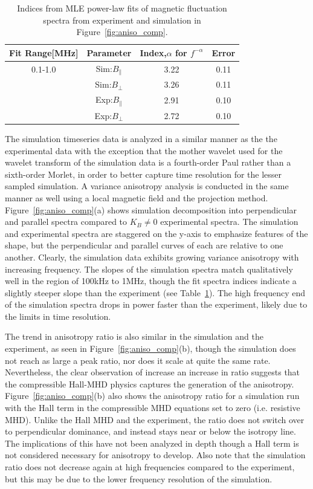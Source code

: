 \documentclass[aip,prl,amsmath,amssymb,reprint,superscriptaddress]{revtex4-1} %
\begin{document}
\begin{table}
\caption{\label{tab:Simindices}Indices from MLE power-law fits of magnetic fluctuation spectra from experiment and simulation in Figure~\ref{fig:aniso_comp}.}
\begin{tabular}{cccc}
\toprule
Fit Range[MHz]	&	Parameter						&	Index,$\alpha$ for $f^{-\alpha}$	&Error\\
\hline
0.1-1.0					& Sim:$B_{\parallel}$	& 3.22	&0.11\\
								& Sim:$B_{\perp}$			& 3.26  &0.11\\
								& Exp:$B_{\parallel}$	& 2.91	&0.10\\
								& Exp:$B_{\perp}$			& 2.72  &0.10\\
\hline
\end{tabular}
\end{table}

The simulation timeseries data is analyzed in a similar manner as the the experimental data with the exception that the mother wavelet used for the wavelet transform of the simulation data is a fourth-order Paul rather than a sixth-order Morlet, in order to better capture time resolution for the lesser sampled simulation. A variance anisotropy analysis is conducted in the same manner as well using a local magnetic field and the projection method. Figure~\ref{fig:aniso_comp}(a) shows simulation decomposition into perpendicular and parallel spectra compared to $K_{B}\neq 0$ experimental spectra. The simulation and experimental spectra are staggered on the y-axis to emphasize features of the shape, but the perpendicular and parallel curves of each are relative to one another. Clearly, the simulation data exhibits growing variance anisotropy with increasing frequency. The slopes of the simulation spectra match qualitatively well in the region of 100kHz to 1MHz, though the fit spectra indices indicate a slightly steeper slope than the experiment (see Table~\ref{tab:Simindices}). The high frequency end of the simulation spectra drops in power faster than the experiment, likely due to the limits in time resolution.

The trend in anisotropy ratio is also similar in the simulation and the experiment, as seen in Figure~\ref{fig:aniso_comp}(b), though the simulation does not reach as large a peak ratio, nor does it scale at quite the same rate. Nevertheless, the clear observation of increase an increase in ratio suggests that the compressible Hall-MHD physics captures the generation of the anisotropy. Figure~\ref{fig:aniso_comp}(b) also shows the anisotropy ratio for a simulation run with the Hall term in the compressible MHD equations set to zero (i.e. resistive MHD). Unlike the Hall MHD and the experiment, the ratio does not switch over to perpendicular dominance, and instead stays near or below the isotropy line. The implications of this have not been analyzed in depth though a Hall term is not considered necessary for anisotropy to develop. Also note that the simulation ratio does not decrease again at high frequencies compared to the experiment, but this may be due to the lower frequency resolution of the simulation.
\end{document}
